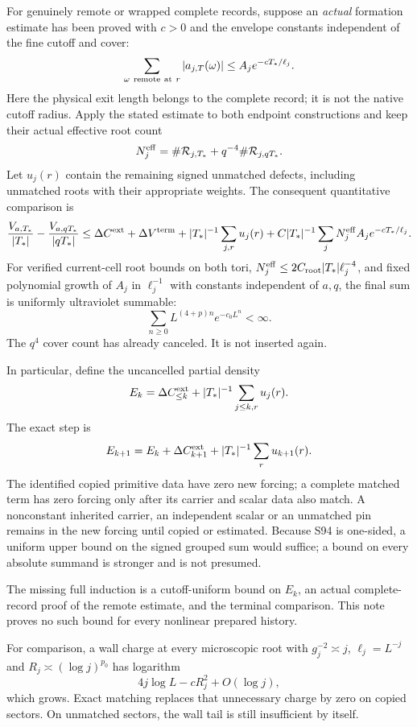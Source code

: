 \documentclass[11pt,letterpaper]{article}
\theoremstyle{remark}\newtheorem{remark}[theorem]{Remark}
\begin{document}
For genuinely remote or wrapped complete records, suppose an \emph{actual} formation estimate has been proved with $c>0$ and the envelope constants independent of the fine cutoff and cover:
\[
 \sum_{\omega\ {\rm remote\ at}\ r}|a_{j,T}(\omega)|
 \le A_j e^{-cT_*/\ell_j}.
\]
Here the physical exit length belongs to the complete record; it is not the native cutoff radius. Apply the stated estimate to both endpoint constructions and keep their actual effective root count
\[
 N_j^{\rm eff}=\#\mathcal R_{j,T_*}
                    +q^{-4}\#\mathcal R_{j,qT_*}.
\]
Let $u_j(r)$ contain the remaining signed unmatched defects, including unmatched roots with their appropriate weights. The consequent quantitative comparison is
\begin{equation}\label{eq:s94criterion}
 \frac{V_{a,T_*}}{|T_*|}-\frac{V_{a,qT_*}}{|qT_*|}
 \le
 \Delta C^{\rm ext}+\Delta V^{\rm term}
 +|T_*|^{-1}\sum_{j,r}u_j(r)
 +C|T_*|^{-1}\sum_jN_j^{\rm eff}A_je^{-cT_*/\ell_j}.
\end{equation}
For verified current-cell root bounds on both tori,
$N_j^{\rm eff}\le 2C_{\rm root}|T_*|\ell_j^{-4}$, and fixed polynomial growth of $A_j$ in $\ell_j^{-1}$ with constants independent of $a,q$, the final sum is uniformly ultraviolet summable:
\[
 \sum_{n\ge0}L^{(4+p)n}e^{-c_0L^n}<\infty.
\]
The $q^4$ cover count has already canceled. It is not inserted again.

In particular, define the uncancelled partial density
\[
 E_k=\Delta C^{\rm ext}_{\le k}
       +|T_*|^{-1}\sum_{j\le k,r}u_j(r).
\]
The exact step is
\begin{equation}\label{eq:scalarind}
 E_{k+1}
 =E_k+\Delta C^{\rm ext}_{k+1}
       +|T_*|^{-1}\sum_r u_{k+1}(r).
\end{equation}
The identified copied primitive data have zero new forcing; a complete matched term has zero forcing only after its carrier and scalar data also match. A nonconstant inherited carrier, an independent scalar or an unmatched pin remains in the new forcing until copied or estimated. Because S94 is one-sided, a uniform upper bound on the signed grouped sum would suffice; a bound on every absolute summand is stronger and is not presumed.

The missing full induction is a cutoff-uniform bound on $E_k$, an actual complete-record proof of the remote estimate, and the terminal comparison. This note proves no such bound for every nonlinear prepared history.

For comparison, a wall charge at every microscopic root with
$g_j^{-2}\asymp j$, $\ell_j=L^{-j}$ and $R_j\asymp(\log j)^{p_0}$ has logarithm
\[
 4j\log L-cR_j^2+O(\log j),
\]
which grows. Exact matching replaces that unnecessary charge by zero on copied sectors. On unmatched sectors, the wall tail is still insufficient by itself.
\end{document}
